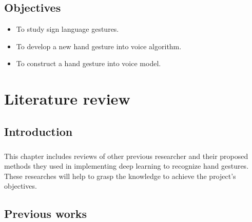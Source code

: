 \documentclass[12pt]{report}
\begin{document}
        \section{Objectives}
        \begin{itemize}
            \item To study sign language gestures.
            \item To develop a new hand gesture into voice algorithm.
            \item To construct a hand gesture into voice model.
        \end{itemize}    
    \chapter{Literature review}
        \section{Introduction}
            \paragraph{}
            This chapter includes reviews of other previous researcher
            and their proposed methods they used in implementing deep learning
            to recognize hand gestures. These researches will help to grasp the knowledge
            to achieve the project's objectives. 
        \section{Previous works}
            \paragraph{}
            

    
\end{document}

